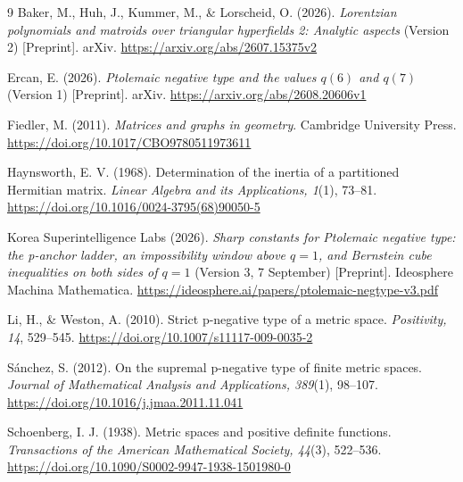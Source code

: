 \documentclass[11pt,a4paper]{article}
\theoremstyle{definition}
\theoremstyle{remark}
\numberwithin{equation}{section}
\begin{document}
\clearpage
\begin{thebibliography}{9}
\providecommand{\natexlab}[1]{#1}
\small
{}
Baker, M., Huh, J., Kummer, M., \& Lorscheid, O. (2026).
\emph{Lorentzian polynomials and matroids over triangular hyperfields 2: Analytic aspects} (Version 2) [Preprint]. arXiv.
\url{https://arxiv.org/abs/2607.15375v2}

Ercan, E. (2026). \emph{Ptolemaic negative type and the values $q(6)$ and $q(7)$} (Version 1) [Preprint]. arXiv.
\url{https://arxiv.org/abs/2608.20606v1}

Fiedler, M. (2011). \emph{Matrices and graphs in geometry}. Cambridge University Press.
\url{https://doi.org/10.1017/CBO9780511973611}

Haynsworth, E. V. (1968). Determination of the inertia of a partitioned Hermitian matrix. \emph{Linear Algebra and its Applications, 1}(1), 73--81.
\url{https://doi.org/10.1016/0024-3795(68)90050-5}

Korea Superintelligence Labs (2026). \emph{Sharp constants for Ptolemaic negative type: the p-anchor ladder, an impossibility window above $q=1$, and Bernstein cube inequalities on both sides of $q=1$} (Version 3, 7 September) [Preprint]. Ideosphere Machina Mathematica.
\url{https://ideosphere.ai/papers/ptolemaic-negtype-v3.pdf}

Li, H., \& Weston, A. (2010). Strict p-negative type of a metric space. \emph{Positivity, 14}, 529--545.
\url{https://doi.org/10.1007/s11117-009-0035-2}

S\'{a}nchez, S. (2012). On the supremal p-negative type of finite metric spaces. \emph{Journal of Mathematical Analysis and Applications, 389}(1), 98--107.
\url{https://doi.org/10.1016/j.jmaa.2011.11.041}

Schoenberg, I. J. (1938). Metric spaces and positive definite functions. \emph{Transactions of the American Mathematical Society, 44}(3), 522--536.
\url{https://doi.org/10.1090/S0002-9947-1938-1501980-0}
\end{thebibliography}
\end{document}
